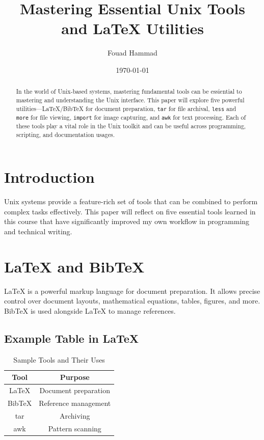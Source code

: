 \documentclass[11pt]{article}
\title{Mastering Essential Unix Tools and LaTeX Utilities}
\author{Fouad Hammad}
\date{\today}
\begin{document}
	
	\maketitle
	
	\begin{abstract}
		In the world of Unix-based systems, mastering fundamental tools can be essiential to mastering and understanding the Unix interface. This paper will explore five powerful utilities—LaTeX/BibTeX for document preparation, \texttt{tar} for file archival, \texttt{less} and \texttt{more} for file viewing, \texttt{import} for image capturing, and \texttt{awk} for text processing. Each of these tools play a vital role in the Unix toolkit and can be useful across programming, scripting, and documentation usages.
	\end{abstract}
	
	\section{Introduction}
	Unix systems provide a feature-rich set of tools that can be combined to perform complex tasks effectively. This paper will reflect on five essential tools learned in this course that have significantly improved my own workflow in programming and technical writing.
	
	\section{LaTeX and BibTeX}
	LaTeX is a powerful markup language for document preparation. It allows precise control over document layouts, mathematical equations, tables, figures, and more. BibTeX is used alongside LaTeX to manage references.
	
	\subsection*{Example Table in LaTeX}
	\begin{table}[H]
		\centering
		\begin{tabular}{|c|c|}
			\hline
			Tool & Purpose \\
			\hline
			LaTeX & Document preparation \\
			BibTeX & Reference management \\
			tar & Archiving \\
			awk & Pattern scanning \\
			\hline
		\end{tabular}
		\caption{Sample Tools and Their Uses}
	\end{table}
	
\end{document}
